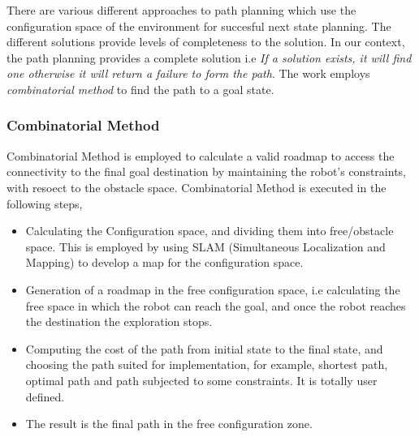 There are various different approaches to path planning which use the configuration space of the environment for succesful next state planning. The different solutions provide levels of completeness to the solution. In our context, the path planning provides a complete solution i.e \textit{If a solution exists, it will find one otherwise it will return a failure to form the path}. 
The work employs \textit{combinatorial method} to find the path to a goal state. 

\subsubsection{Combinatorial Method}
Combinatorial Method is employed to calculate a valid roadmap to access the connectivity to the final goal destination by maintaining the robot's constraints, with resoect to the obstacle space.
Combinatorial Method is executed in the following steps,
\begin{itemize}
    \item Calculating the Configuration space, and dividing them into free/obstacle space. This is employed by using SLAM (Simultaneous Localization and Mapping) to develop a map for the configuration space.
    \item Generation of a roadmap in the free configuration space, i.e calculating the free space in which the robot can reach the goal, and once the robot reaches the destination the exploration stops.
    \item Computing the cost of the path from initial state to the final state, and choosing the path suited for implementation, for example, shortest path, optimal path and path subjected to some constraints. It is totally user defined.
    \item The result is the final path in the free configuration zone.
\end{itemize}

